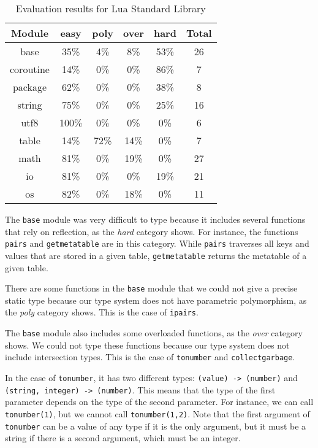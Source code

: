 \begin{table}[!ht]
\begin{center}
\begin{tabular}{|c|c|c|c|c|c|}
\hline
\textbf{Module} & \textbf{easy} & \textbf{poly} & \textbf{over} & \textbf{hard} & \textbf{Total} \\
\hline
base & 35\% & 4\% & 8\% & 53\% & 26 \\ %
\hline
coroutine & 14\% & 0\% & 0\% & 86\% & 7 \\ %
\hline
package & 62\% & 0\% & 0\% & 38\% & 8 \\ %
\hline
string & 75\% & 0\% & 0\% & 25\% & 16 \\ %
\hline
utf8 & 100\% & 0\% & 0\% & 0\% & 6 \\ %
\hline
table & 14\% & 72\% & 14\% & 0\% & 7 \\ %
\hline
math & 81\% & 0\% & 19\% & 0\% & 27 \\ %
\hline
io & 81\% & 0\% & 0\% & 19\% & 21 \\ %
\hline
os & 82\% & 0\% & 18\% & 0\% & 11 \\ %
\hline
\end{tabular}
\end{center}
\caption{Evaluation results for Lua Standard Library}
\label{tab:evallsl}
\end{table}

The \texttt{base} module was very difficult to type
because it includes several functions that rely on reflection,
as the \emph{hard} category shows.
For instance, the functions \texttt{pairs} and \texttt{getmetatable}
are in this category.
While \texttt{pairs} traverses all keys and values that are stored
in a given table, \texttt{getmetatable} returns the metatable of a
given table.

There are some functions in the \texttt{base} module that
we could not give a precise static type because our type
system does not have parametric polymorphism,
as the \emph{poly} category shows.
This is the case of \texttt{ipairs}.

The \texttt{base} module also includes some overloaded functions,
as the \emph{over} category shows.
We could not type these functions because our type system does
not include intersection types.
This is the case of \texttt{tonumber} and \texttt{collectgarbage}.

In the case of \texttt{tonumber}, it has two different types:
\texttt{(value) -> (number)} and \texttt{(string, integer) -> (number)}.
This means that the type of the first parameter depends on the
type of the second parameter.
For instance, we can call \texttt{tonumber(1)}, but we cannot
call \texttt{tonumber(1,2)}.
Note that the first argument of \texttt{tonumber} can be
a value of any type if it is the only argument, but it must
be a string if there is a second argument,
which must be an integer.

